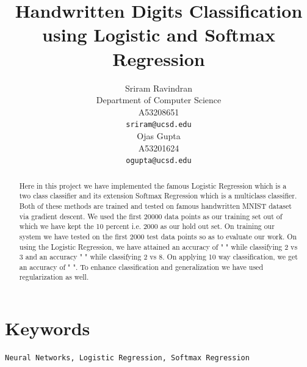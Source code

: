\documentclass{article} %
\title{Handwritten Digits Classification using Logistic and Softmax Regression}
\author{
Sriram Ravindran\\
Department of Computer Science\\
A53208651 \\
\texttt{sriram@ucsd.edu} \\
\And
Ojas Gupta \\
A53201624 \\
\texttt{ogupta@ucsd.edu} \\
}
\begin{document}
\maketitle
\begin{abstract}
Here in this project we have implemented the famous Logistic Regression which is a two class classifier and its extension Softmax Regression which is a multiclass classifier. Both of these methods are trained and tested on famous handwritten MNIST dataset via gradient descent. We used the first 20000 data points as our training set out of which we have kept the 10 percent i.e. 2000 as our hold out set. On training our system we have tested on the first 2000 test data points so as to evaluate our work. On using the Logistic Regression, we have attained an accuracy of " " while classifying 2 vs 3 and an accuracy " " while classifying 2 vs 8. On applying 10 way classification, we get an accuracy of " ". To enhance classification and generalization we have used regularization as well. 
\end{abstract}

\section{Keywords}

\begin{verbatim}
Neural Networks, Logistic Regression, Softmax Regression
\end{verbatim}
\end{document}
